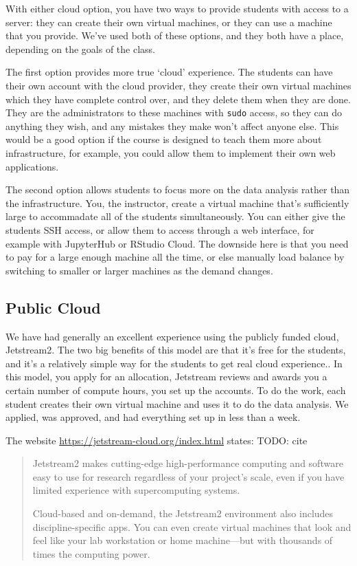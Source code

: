 \documentclass[12pt]{article}
\begin{document}
With either cloud option, you have two ways to provide students with access to a server: they can create their own virtual machines, or they can use a machine that you provide.
We've used both of these options, and they both have a place, depending on the goals of the class.

The first option provides more true `cloud' experience.
The students can have their own account with the cloud provider, they create their own virtual machines which they have complete control over, and they delete them when they are done.
They are the administrators to these machines with \texttt{sudo} access, so they can do anything they wish, and any mistakes they make won't affect anyone else.
This would be a good option if the course is designed to teach them more about infrastructure, for example, you could allow them to implement their own web applications.

The second option allows students to focus more on the data analysis rather than the infrastructure.
You, the instructor, create a virtual machine that's sufficiently large to accommadate all of the students simultaneously.
You can either give the students SSH access, or allow them to access through a web interface, for example with JupyterHub or RStudio Cloud.
The downside here is that you need to pay for a large enough machine all the time, or else manually load balance by switching to smaller or larger machines as the demand changes.




\subsection{Public Cloud}

We have had generally an excellent experience using the publicly funded cloud, Jetstream2.
The two big benefits of this model are that it's free for the students, and it's a relatively simple way for the students to get real cloud experience..
In this model, you apply for an allocation, Jetstream reviews and awards you a certain number of compute hours, you set up the accounts.
To do the work, each student creates their own virtual machine and uses it to do the data analysis.
We applied, was approved, and had everything set up in less than a week.

The website \url{https://jetstream-cloud.org/index.html} states:
TODO: cite

\begin{quote}
Jetstream2 makes cutting-edge high-performance computing and software easy to use for research regardless of your project’s scale, even if you have limited experience with supercomputing systems.

Cloud-based and on-demand, the Jetstream2 environment also includes discipline-specific apps. You can even create virtual machines that look and feel like your lab workstation or home machine—but with thousands of times the computing power.
\end{quote}
\end{document}
